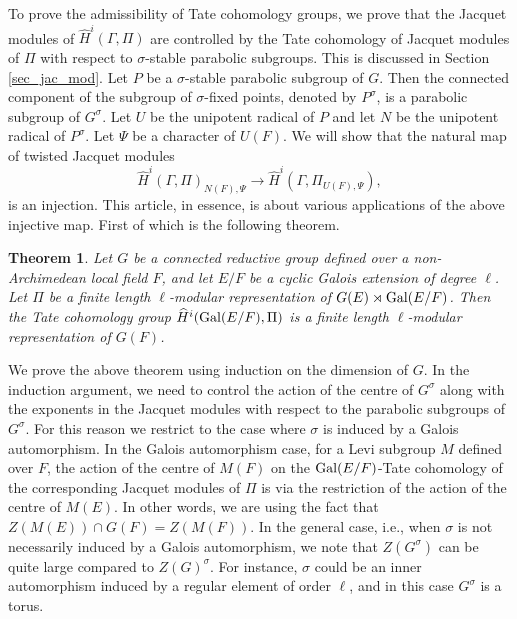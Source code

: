 \documentclass[10pt, reqno]{amsart}
\theoremstyle{plain}
\numberwithin{equation}{section} \newcommand{\di}{\operatorname{dim}}
\newtheorem{theorem}{Theorem}[subsection]
\begin{document}
To prove the admissibility of Tate cohomology groups, we 
prove that the Jacquet modules of $\widehat{H}^i(\Gamma, \Pi)$ 
are controlled by the Tate cohomology of Jacquet modules of $\Pi$ 
with respect to $\sigma$-stable parabolic subgroups. This is discussed in 
Section \ref{sec_jac_mod}.
Let $P$ be a $\sigma$-stable parabolic subgroup of $G$. Then the
connected component of the subgroup of $\sigma$-fixed points,
denoted by $P^\sigma$, is a parabolic subgroup of
$G^\sigma$. Let $U$ be the unipotent radical of $P$ and let $N$ be
the unipotent radical of $P^\sigma$. Let $\Psi$ be a character of
$U(F)$. We will show that the natural map of twisted Jacquet modules
\begin{equation}\label{jac_injection_intro}
\widehat{H}^i(\Gamma, \Pi)_{N(F), \Psi}\rightarrow
\widehat{H}^i(\Gamma, \Pi_{U(F), \Psi}),
\end{equation}
is an injection. 
This article, in essence, is about various applications of the above
injective map. First of which is the following theorem. 
\begin{theorem}
Let $G$ be a connected reductive group defined over a non-Archimedean local
field $F$, and let $E/F$ be a cyclic Galois extension of degree
$\ell$. Let $\Pi$ be a finite length $\ell$-modular representation of
$G(E)\rtimes{\rm Gal}(E/F)$. Then the
Tate cohomology group $\widehat{H}^i({\rm Gal}(E/F), \Pi)$ is a finite
length $\ell$-modular representation of $G(F)$.
\end{theorem}
We prove the above theorem using induction on the dimension of $G$.
In the induction argument, we need to control the action of the centre
of $G^\sigma$ along with the exponents in the Jacquet modules with
respect to the parabolic subgroups of $G^\sigma$. For this reason we
restrict to the case where $\sigma$ is induced by a Galois
automorphism.  In the Galois automorphism case, for a Levi subgroup
$M$ defined over $F$, the action of the centre of $M(F)$ on the
${\rm Gal}(E/F)$-Tate cohomology of the corresponding Jacquet modules
of $\Pi$ is via the restriction of the action of the centre of
$M(E)$. In other words, we are using the fact that
$Z(M(E))\cap G(F)=Z(M(F))$. In the general case, i.e., when $\sigma$
is not necessarily induced by a Galois automorphism, we note that
$Z(G^\sigma)$ can be quite large compared to $Z(G)^\sigma$. For
instance, $\sigma$ could be an inner automorphism induced by a regular
element of order $\ell$, and in this case $G^\sigma$ is a torus.
\end{document}
